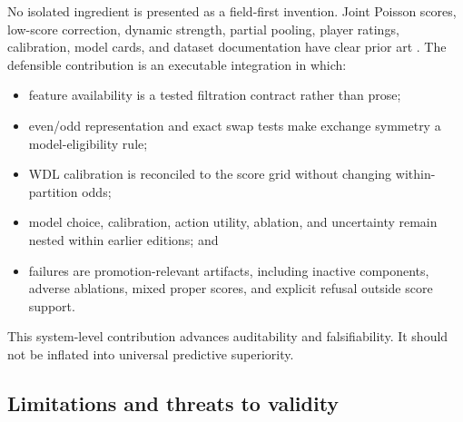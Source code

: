 \documentclass[11pt]{article}
\begin{document}
No isolated ingredient is presented as a field-first invention.  Joint Poisson scores, low-score
correction, dynamic strength, partial pooling, player ratings, calibration, model cards,
and dataset documentation have clear prior art
\citep{dixoncoles1997,ruesalvesen2000,baioblangiardo2010,mitchell2019,gebru2021}.  The defensible
contribution is an executable integration in which:

\begin{itemize}
  \item feature availability is a tested filtration contract rather than prose;
  \item even/odd representation and exact swap tests make exchange symmetry a model-eligibility
  rule;
  \item WDL calibration is reconciled to the score grid without changing within-partition odds;
  \item model choice, calibration, action utility, ablation, and uncertainty remain nested within
  earlier editions; and
  \item failures are promotion-relevant artifacts, including inactive components, adverse
  ablations, mixed proper scores, and explicit refusal outside score support.
\end{itemize}

This system-level contribution advances auditability and falsifiability.  It should not be inflated
into universal predictive superiority.

\subsection{Limitations and threats to validity}
\end{document}
